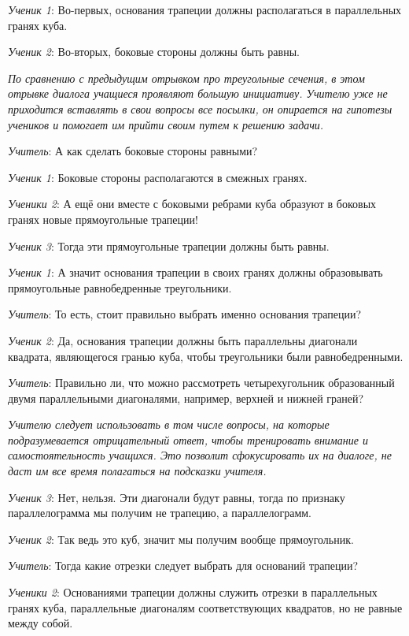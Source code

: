 \documentclass[a4paper,14pt,russian]{extreport}
\begin{document}
\textit{Ученик 1}: Во-первых, основания трапеции должны располагаться в параллельных гранях куба.

\textit{Ученик 2}: Во-вторых, боковые стороны должны быть равны.

\textit{По сравнению с предыдущим отрывком про треугольные сечения, в этом отрывке диалога учащиеся проявляют большую инициативу. Учителю уже не приходится вставлять в свои вопросы все посылки, он опирается на гипотезы учеников и помогает им прийти своим путем к решению задачи.}

\textit{Учитель}: А как сделать боковые стороны равными?

\textit{Ученик 1}: Боковые стороны располагаются в смежных гранях.

\textit{Ученики 2}: А ещё они вместе с боковыми ребрами куба образуют в боковых гранях новые прямоугольные трапеции!

\textit{Ученик 3}: Тогда эти прямоугольные трапеции должны быть равны.

\textit{Ученик 1}: А значит основания трапеции в своих гранях должны образовывать прямоугольные равнобедренные треугольники.

\textit{Учитель}: То есть, стоит правильно выбрать именно основания трапеции?

\textit{Ученик 2}: Да, основания трапеции должны быть параллельны диагонали квадрата, являющегося гранью куба, чтобы треугольники были равнобедренными.

\textit{Учитель}: Правильно ли, что можно рассмотреть четырехугольник образованный двумя параллельными  диагоналями, например, верхней и нижней граней?

\textit{Учителю следует использовать в том числе вопросы, на которые подразумевается отрицательный ответ, чтобы тренировать внимание и самостоятельность учащихся. Это позволит сфокусировать их на диалоге, не даст им все время полагаться на подсказки учителя.}

\textit{Ученик 3}: Нет, нельзя. Эти диагонали будут равны, тогда по признаку параллелограмма мы получим не трапецию, а параллелограмм.

\textit{Ученик 2}: Так ведь это куб, значит мы получим вообще прямоугольник.

\textit{Учитель}: Тогда какие отрезки следует выбрать для оснований трапеции?

\textit{Ученики 2}: Основаниями трапеции должны служить отрезки в параллельных гранях куба, параллельные диагоналям соответствующих квадратов, но не равные между собой.
\end{document}
